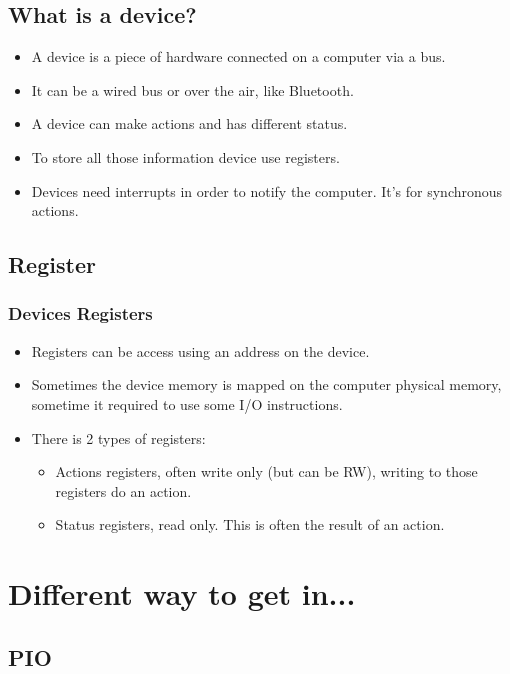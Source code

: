 \subsection{What is a device?}
\begin{frame}
\begin{itemize}
  \item A device is a piece of hardware connected on a computer via a
        bus.
  \item It can be a wired bus or over the air, like Bluetooth.
  \item A device can make actions and has different status.
  \item To store all those information device use registers.
  \item Devices need interrupts in order to notify the computer. It's
  for synchronous actions.
\end{itemize}
\end{frame}
\subsection{Register}
\begin{frame}
\frametitle{Devices Registers}
\begin{itemize}
        \item Registers can be access using an address on the device.
        \item Sometimes the device memory is mapped on the computer physical memory, sometime it required to use some I/O instructions.
        \item There is 2 types of registers:
        \begin{itemize}
          \item Actions registers, often write only (but can be RW), writing to those registers do an action.
          \item Status registers, read only. This is often the result of an action.
        \end{itemize}
\end{itemize}
\end{frame}


\section{Different way to get in...}
\subsection{PIO}


